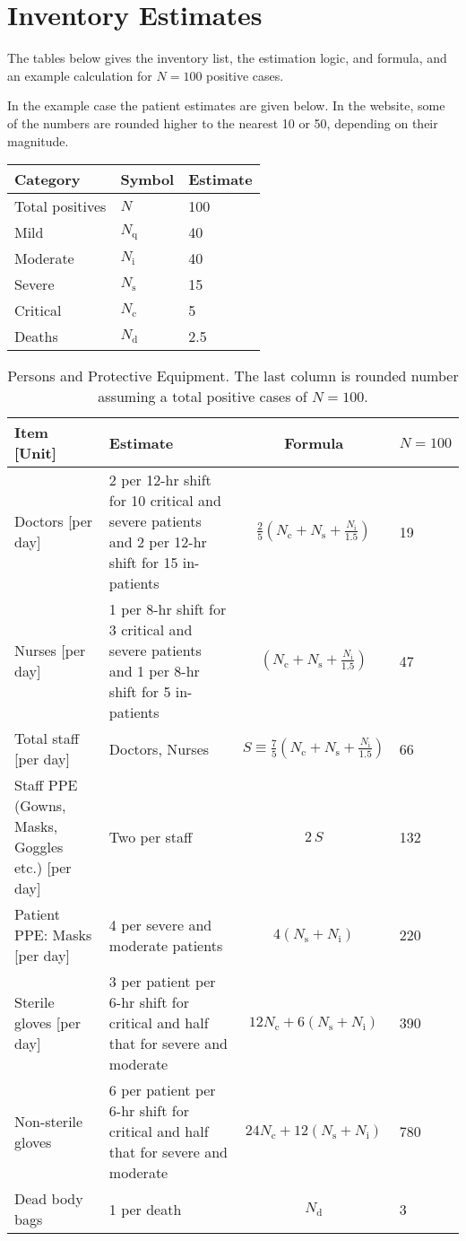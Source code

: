 \documentclass{article}
\newcommand{\nd}{\ensuremath{N_{\mathrm{d}}}}
\newcommand{\nc}{\ensuremath{N_{\mathrm{c}}}}
\newcommand{\ns}{\ensuremath{N_{\mathrm{s}}}}
\newcommand{\nin}{\ensuremath{N_{\mathrm{i}}}}
\newcommand{\nq}{\ensuremath{N_{\mathrm{q}}}}
\begin{document}
\section{Inventory Estimates}
The tables below gives the inventory list, the estimation logic, and
formula, and an example calculation for $N=100$ positive cases.

In the example case the patient estimates are given below. In the
website, some of the numbers are rounded higher to the nearest 10 or
50, depending on their magnitude.

\noindent
\begin{tabular}{lll}
  \toprule
  Category & Symbol & Estimate \\
  \midrule
  Total positives & $N$ & 100 \\
  Mild & $\nq$ & 40 \\
  Moderate & $\nin$ & 40 \\
  Severe & $\ns$ & 15 \\
  Critical & $\nc$ & 5\\
  Deaths & $\nd$ & 2.5\\
  \bottomrule
\end{tabular}


\begin{landscape}
\begin{table}
  \caption{Persons and Protective Equipment. The last column is
    rounded number assuming a total positive cases of $N=100$.}
  \begin{tabularx}{\linewidth}{XXcl}
    \toprule
    Item [Unit] & Estimate & Formula & $N=100$ \\
    \midrule
Doctors [per day] & 2 per 12-hr shift for 10 critical and severe
patients and 2 
per 12-hr shift for 15 in-patients &
$\frac{2}{5}\left(\nc+\ns+\frac{\nin}{1.5}\right)$ & 19 \\
Nurses [per day] & 1 per 8-hr shift for 3 critical and severe patients
and 1 per 8-hr shift for 5 in-patients &
$\left(\nc+\ns+\frac{\nin}{1.5}\right)$ & 47\\
Total staff [per day]& Doctors, Nurses &
$S \equiv \frac{7}{5} \left(\nc+\ns+\frac{\nin}{1.5}\right)$ & 66 \\
Staff PPE (Gowns, Masks, Goggles etc.) [per day]&
Two per staff & $2 \, S$  & 132\\
Patient PPE: Masks [per day] & 4 per severe and moderate patients &
$4 (\ns+\nin)$ & 220 \\
Sterile gloves [per day]&
 3 per patient per 6-hr shift for critical and half that for severe and
 moderate &
$12\nc + 6 (\ns+\nin)$ & 390 \\
Non-sterile gloves &
 6 per patient per 6-hr shift for critical and half that for severe and
 moderate &
$24\nc + 12 (\ns+\nin)$ & 780 \\
Dead body bags & 1 per death & $\nd$ & 3 \\
    \bottomrule
  \end{tabularx}
\end{table}
\end{landscape}
\end{document}

